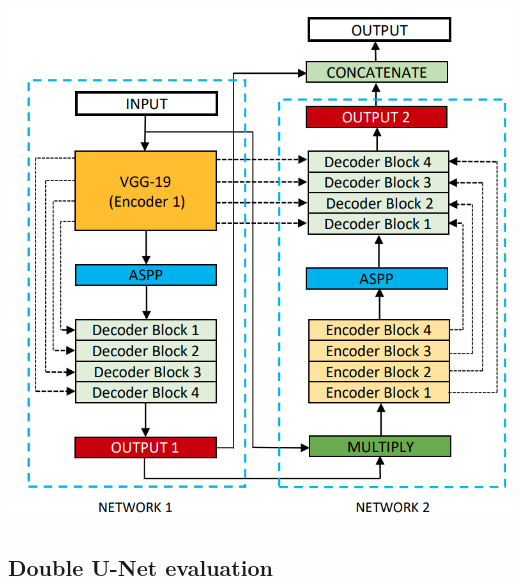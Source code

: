 
\begin{center}
\includegraphics[width=\textwidth]{images/double_unet.png}
\end{center}
%

\newpage
\subsection{Double U-Net evaluation}


